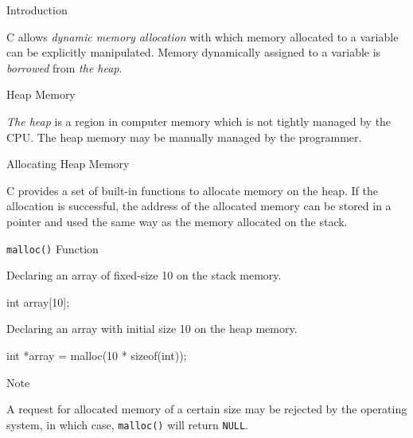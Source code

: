\documentclass[compress]{beamer}
\begin{document}
\begin{slide}
	\begin{block}{Introduction}

	C allows \emph{dynamic memory allocation} with which memory allocated to a variable can be explicitly manipulated.
	Memory dynamically assigned to a variable is \emph{borrowed} from \emph{the heap}.

	\end{block}
\end{slide}

\begin{slide}
	\begin{block}{Heap Memory}

	\textit{The heap} is a region in computer memory which is not tightly managed by the CPU.
	The heap memory may be manually managed by the programmer.

	\end{block}
\end{slide}

\begin{slide}
	\begin{block}{Allocating Heap Memory}

	C provides a set of built-in functions to allocate memory on the heap.
	If the allocation is successful, the address of the allocated memory can be stored in a pointer and used the same way as the memory allocated on the stack.

	\end{block}
\end{slide}

\begin{slide}
	\begin{block}{\texttt{malloc()} Function}

	Declaring an array of fixed-size 10 on the stack memory.

	\begin{terminal}
	int array[10];
	\end{terminal}

	Declaring an array with initial size 10 on the heap memory.

	\begin{terminal}
	int *array = malloc(10 * sizeof(int));
	\end{terminal}

	\end{block}
\end{slide}

\begin{slide}
	\begin{block}{Note}

	A request for allocated memory of a certain size may be rejected by the operating system, in which case, \texttt{malloc()} will return \texttt{NULL}.

	\end{block}
\end{slide}
\end{document}
